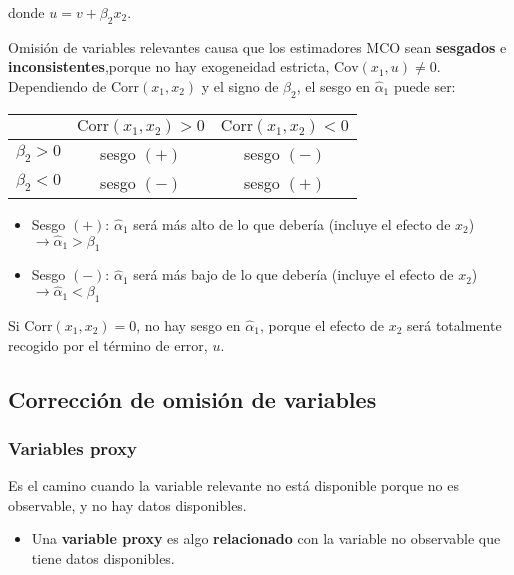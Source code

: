 \documentclass[10pt, a4paper, landscape]{extarticle}
\newcommand{\Cov}{\mathrm{Cov}}
\newcommand{\Corr}{\mathrm{Corr}}
\begin{document}
\begin{multicols}{3}
\quad donde $u = v + \beta_2 x_2$.

Omisión de variables relevantes causa que los estimadores MCO sean \textbf{sesgados} e \textbf{inconsistentes},porque no hay exogeneidad estricta, $\Cov(x_1, u) \neq 0$. Dependiendo de $\Corr(x_1, x_2)$ y el signo de $\beta_2$, el sesgo en $\hat{\alpha}_1$ puede ser:

\begin{center}
	\begin{tabular}{ c | c c }
		              & $\Corr(x_1, x_2) > 0$ & $\Corr(x_1, x_2) < 0$ \\ \hline
		$\beta_2 > 0$ & sesgo $(+)$           & sesgo $(-)$           \\
		$\beta_2 < 0$ & sesgo $(-)$           & sesgo $(+)$
	\end{tabular}
\end{center}

\begin{itemize}[leftmargin=*]
	\item Sesgo $(+)$: $\hat{\alpha}_1$ será más alto de lo que debería (incluye el efecto de $x_2$) $\rightarrow \hat{\alpha}_1 > \beta_1$
	\item Sesgo $(-)$: $\hat{\alpha}_1$ será más bajo de lo que debería (incluye el efecto de $x_2$) $\rightarrow \hat{\alpha}_1 < \beta_1$
\end{itemize}

Si $\Corr(x_1, x_2) = 0$, no hay sesgo en $\hat{\alpha}_1$, porque el efecto de $x_2$ será totalmente recogido por el término de error, $u$.

\columnbreak

\subsection*{Corrección de omisión de variables}

\subsubsection*{Variables proxy}

Es el camino cuando la variable relevante no está disponible porque no es observable, y no hay datos disponibles.

\begin{itemize}[leftmargin=*]
	\item Una \textbf{variable proxy} es algo \textbf{relacionado} con la variable no observable que tiene datos disponibles.
\end{itemize}


\end{multicols}
\end{document}
